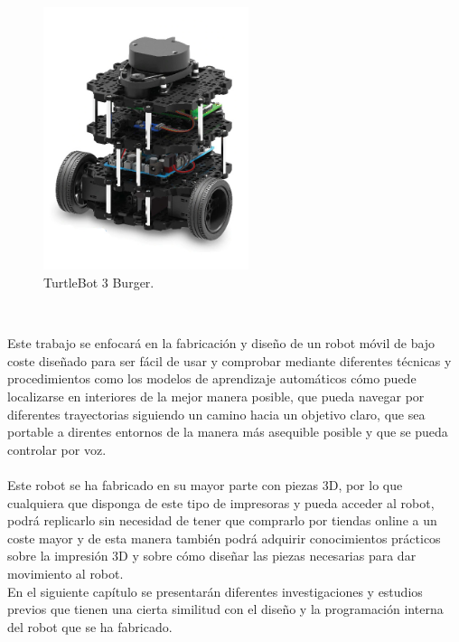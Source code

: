 \begin{figure} [h!]
  \begin{center}
    \includegraphics[width=6cm]{figs/turtlebot3burguer.jpg}
  \end{center}
  \caption{TurtleBot 3 Burger.}
  \label{fig:turtlebot}
\end{figure}\


Este trabajo se enfocará en la fabricación y diseño de un robot móvil de bajo coste diseñado para ser fácil de usar y comprobar mediante diferentes técnicas y procedimientos como los modelos de aprendizaje automáticos cómo puede localizarse en interiores de la mejor manera posible, que pueda navegar por diferentes trayectorias siguiendo un camino hacia un objetivo claro, que sea portable a direntes entornos de la manera más asequible posible y que se pueda controlar por voz.\\ \\ Este robot se ha fabricado en su mayor parte con piezas 3D, por lo que cualquiera que disponga de este tipo de impresoras y pueda acceder al robot, podrá replicarlo sin necesidad de tener que comprarlo por tiendas online a un coste mayor y de esta manera también podrá adquirir conocimientos prácticos sobre la impresión 3D y sobre cómo diseñar las piezas necesarias para dar movimiento al robot. \\

En el siguiente capítulo se presentarán diferentes investigaciones y estudios previos que tienen una cierta similitud con el diseño y la programación interna del robot que se ha fabricado.

\vspace{15cm} %







